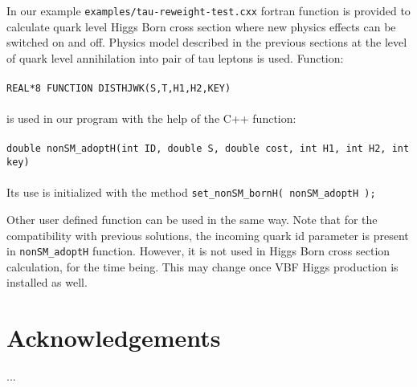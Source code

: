 \documentclass[12pt]{article}
\begin{document}
In our example {\tt examples/tau-reweight-test.cxx} fortran function is provided to calculate 
quark level Higgs Born cross section where new physics effects can be switched on and off.
Physics model described in the previous sections
at the level of quark level annihilation into pair of tau leptons is used. Function: \\
\\
{\tt REAL*8 FUNCTION DISTHJWK(S,T,H1,H2,KEY)} \\
\\
is used in our program with the help of the C++ function: \\
\\
{\tt  double nonSM{\_}adoptH(int ID, double S, double cost, int H1, int H2, int key)} \\
\\
Its use is initialized with the method 
{\tt set{\_}nonSM{\_}bornH( nonSM{\_}adoptH ); }

Other user defined function can be used in the same way.
Note that for the compatibility with previous solutions, the incoming quark id parameter is
present in {\tt nonSM{\_}adoptH} function. However, it is not used in Higgs Born cross section
calculation, for the time being. This may change once VBF Higgs production 
is installed as well.


\section*{Acknowledgements}
... 

{}

\end{document}
